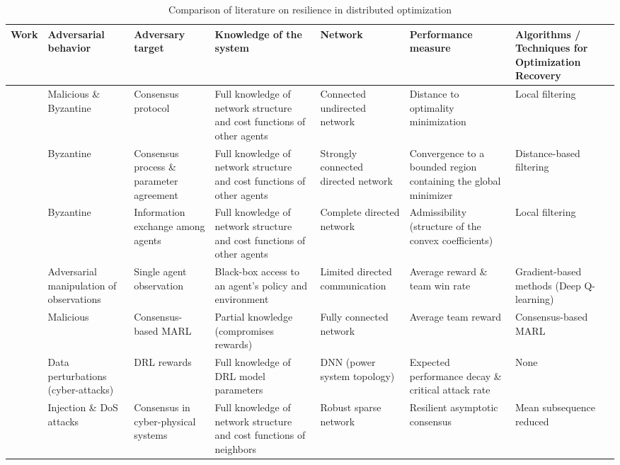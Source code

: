 \documentclass[journal]{IEEEtran}
\begin{document}
\begin{table*}[htbp]
  \caption{Comparison of literature on resilience in distributed optimization}
  \centering
  \footnotesize %
  \begin{adjustbox}{width=\textwidth}
    \begin{tabular}{cp{1.5cm}p{1.5cm}p{3.5cm}p{2.5cm}p{2.5cm}p{3cm}}
      \toprule
      \textbf{Work} & \textbf{Adversarial behavior}  & \textbf{Adversary target} & \textbf{Knowledge of the system} & \textbf{Network} & \textbf{Performance measure} & \textbf{Algorithms / Techniques for Optimization Recovery} \\
      \midrule
      \cite{sundaram2018distributed} & Malicious \& Byzantine \footnotemark[2] & Consensus protocol & Full knowledge of network structure and cost functions of other agents & Connected undirected network & Distance to optimality minimization & Local filtering \\ 
      \midrule
      \cite{kuwaranancharoen2020byzantine} & Byzantine & Consensus process \& parameter agreement & Full knowledge of network structure and cost functions of other agents & Strongly connected directed network & Convergence to a bounded region containing the global minimizer & Distance-based filtering \\
      \midrule
      \cite{su2020byzantine} & Byzantine & Information exchange among agents & Full knowledge of network structure and cost functions of other agents & Complete directed network & Admissibility (structure of the convex coefficients) & Local filtering \\
      \midrule
      \cite{lin2020robustness} & Adversarial manipulation of observations & Single agent observation & Black-box access to an agent's policy and environment & Limited directed communication & Average reward \& team win rate & Gradient-based methods (Deep Q-learning) \\
      \midrule
      \cite{figura2021adversarial} & Malicious & Consensus-based MARL & Partial knowledge (compromises rewards) & Fully connected network & Average team reward & Consensus-based MARL \\
      \midrule
      \cite{zheng2021vulnerability} & Data perturbations (cyber-attacks) & DRL rewards & Full knowledge of DRL model parameters & DNN (power system topology) & Expected performance decay \& critical attack rate & None \\
      \midrule
      \cite{ishii2022overview} & Injection \& DoS attacks & Consensus in cyber-physical systems & Full knowledge of network structure and cost functions of neighbors & Robust sparse network & Resilient asymptotic consensus & Mean subsequence reduced \\

\end{tabular}
\end{adjustbox}
\end{table*}
\end{document}

